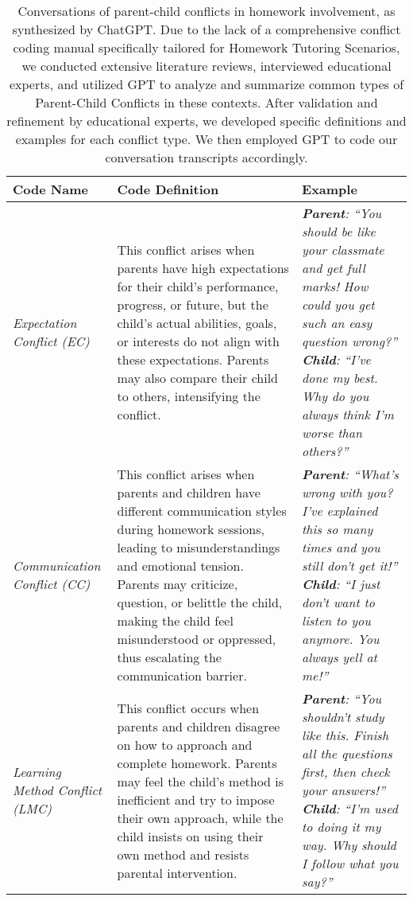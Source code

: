 \begin{table}
\centering
\footnotesize
\caption{Conversations of parent-child conflicts in homework involvement, as synthesized by ChatGPT. Due to the lack of a comprehensive conflict coding manual specifically tailored for Homework Tutoring Scenarios, we conducted extensive literature reviews, interviewed educational experts, and utilized GPT to analyze and summarize common types of Parent-Child Conflicts in these contexts. After validation and refinement by educational experts, we developed specific definitions and examples for each conflict type. We then employed GPT to code our conversation transcripts accordingly.}
\label{tab:conflict}
\begin{tabular}{p{} p{} p{}}
\toprule
\textbf{Code Name} & \textbf{Code Definition} & \textbf{Example} \\ 
\midrule
\textit{Expectation Conflict (EC)} & This conflict arises when parents have high expectations for their child's performance, progress, or future, but the child’s actual abilities, goals, or interests do not align with these expectations. Parents may also compare their child to others, intensifying the conflict. & \textit{\textbf{Parent}: “You should be like your classmate and get full marks! How could you get such an easy question wrong?”} \newline \textit{\textbf{Child}: “I’ve done my best. Why do you always think I’m worse than others?”} \\

\midrule
\textit{Communication Conflict (CC)} & This conflict arises when parents and children have different communication styles during homework sessions, leading to misunderstandings and emotional tension. Parents may criticize, question, or belittle the child, making the child feel misunderstood or oppressed, thus escalating the communication barrier. & \textit{\textbf{Parent}: “What’s wrong with you? I’ve explained this so many times and you still don’t get it!”} \newline \textit{\textbf{Child}: “I just don’t want to listen to you anymore. You always yell at me!”} \\

\midrule
\textit{Learning Method \newline Conflict (LMC)} & This conflict occurs when parents and children disagree on how to approach and complete homework. Parents may feel the child’s method is inefficient and try to impose their own approach, while the child insists on using their own method and resists parental intervention. & \textit{\textbf{Parent}: “You shouldn’t study like this. Finish all the questions first, then check your answers!”} \newline \textit{\textbf{Child}: “I’m used to doing it my way. Why should I follow what you say?”} \\


\end{tabular}
\end{table}

